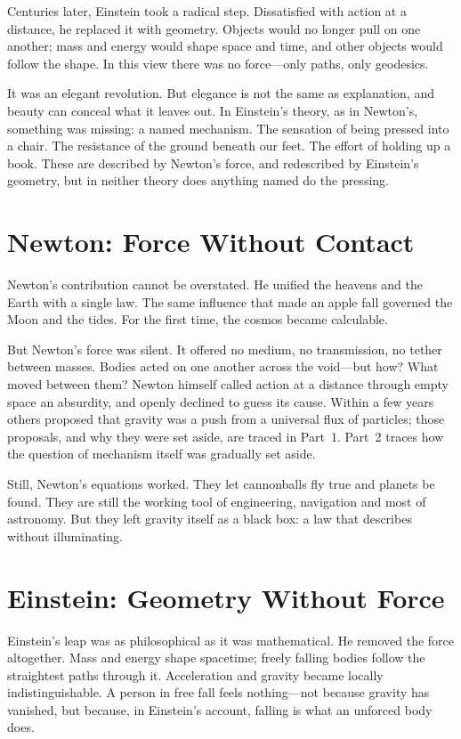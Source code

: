 \documentclass[11pt,a4paper]{article}
\begin{document}
Centuries later, Einstein took a radical step. Dissatisfied with action at a distance, he replaced it with geometry. Objects would no longer pull on one another; mass and energy would shape space and time, and other objects would follow the shape. In this view there was no force---only paths, only geodesics.

It was an elegant revolution. But elegance is not the same as explanation, and beauty can conceal what it leaves out. In Einstein's theory, as in Newton's, something was missing: a named mechanism. The sensation of being pressed into a chair. The resistance of the ground beneath our feet. The effort of holding up a book. These are described by Newton's force, and redescribed by Einstein's geometry, but in neither theory does anything named do the pressing.

\section{Newton: Force Without Contact}

Newton's contribution cannot be overstated. He unified the heavens and the Earth with a single law. The same influence that made an apple fall governed the Moon and the tides. For the first time, the cosmos became calculable.

But Newton's force was silent. It offered no medium, no transmission, no tether between masses. Bodies acted on one another across the void---but how? What moved between them? Newton himself called action at a distance through empty space an absurdity, and openly declined to guess its cause. Within a few years others proposed that gravity was a push from a universal flux of particles; those proposals, and why they were set aside, are traced in Part~1. Part~2 traces how the question of mechanism itself was gradually set aside.

Still, Newton's equations worked. They let cannonballs fly true and planets be found. They are still the working tool of engineering, navigation and most of astronomy. But they left gravity itself as a black box: a law that describes without illuminating.

\section{Einstein: Geometry Without Force}

Einstein's leap was as philosophical as it was mathematical. He removed the force altogether. Mass and energy shape spacetime; freely falling bodies follow the straightest paths through it. Acceleration and gravity became locally indistinguishable. A person in free fall feels nothing---not because gravity has vanished, but because, in Einstein's account, falling is what an unforced body does.
\end{document}
